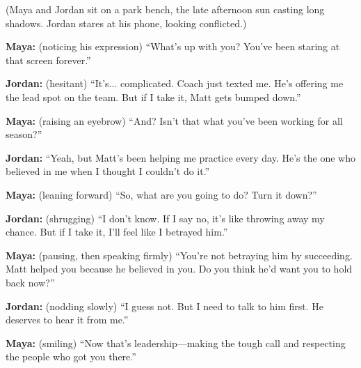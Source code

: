 \documentclass[12pt]{article}
\begin{document}
\begin{tcolorbox}[colframe=black!60, colback=white, 
coltitle=black, colbacktitle=black!15, fonttitle=\bfseries\Large, 
title=\textit{The Choice}, halign title=center, left=10pt, right=10pt, top=10pt, bottom=15pt]

(Maya and Jordan sit on a park bench, the late afternoon sun casting long shadows. Jordan stares at his phone, looking conflicted.)

\textbf{Maya:} (noticing his expression) “What’s up with you? You’ve been staring at that screen forever.”

\textbf{Jordan:} (hesitant) “It’s... complicated. Coach just texted me. He’s offering me the lead spot on the team. But if I take it, Matt gets bumped down.”

\textbf{Maya:} (raising an eyebrow) “And? Isn’t that what you’ve been working for all season?”

\textbf{Jordan:} “Yeah, but Matt’s been helping me practice every day. He’s the one who believed in me when I thought I couldn’t do it.”

\textbf{Maya:} (leaning forward) “So, what are you going to do? Turn it down?”

\textbf{Jordan:} (shrugging) “I don’t know. If I say no, it’s like throwing away my chance. But if I take it, I’ll feel like I betrayed him.”

\textbf{Maya:} (pausing, then speaking firmly) “You’re not betraying him by succeeding. Matt helped you because he believed in you. Do you think he’d want you to hold back now?”

\textbf{Jordan:} (nodding slowly) “I guess not. But I need to talk to him first. He deserves to hear it from me.”

\textbf{Maya:} (smiling) “Now that’s leadership—making the tough call and respecting the people who got you there.”

 

 

\end{tcolorbox}

\vspace{1em}
\end{document}
